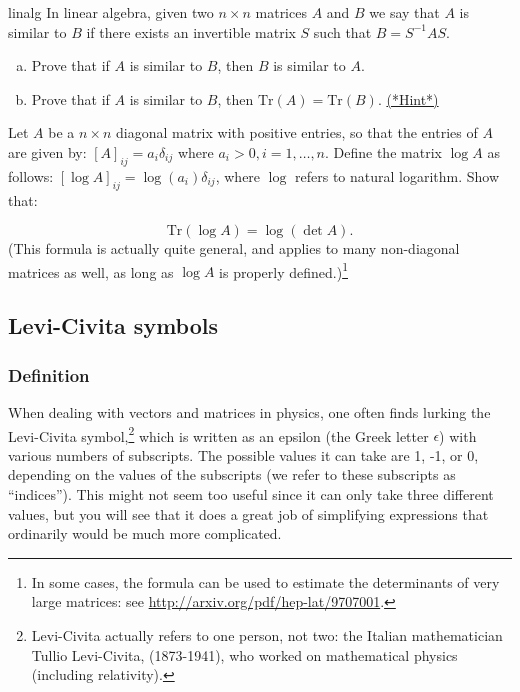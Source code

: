 \begin {exercise}{linalg}
In linear algebra, given two $n \times n$ matrices $A$ and $B$ we say that $A$ is {\bfi similar} to $B$ if there exists an invertible matrix $S$ such that $B = S^{-1}AS$. 
\begin{enumerate}[(a)]
\item
Prove that if $A$ is similar to $B$, then $B$ is similar to $A$.
\item
Prove that if $A$ is similar to $B$, then $\text{Tr} ({A}) = \text{Tr} ({B})$. 
\hyperref[sec:sigma:hints]{(*Hint*)} 
\end{enumerate}
\end{exercise}

\begin {exercise}{}
Let $A$ be a $n \times n$ diagonal matrix with positive entries, so that the entries of $A$ are given by:  $ [A]_{ij} = a_{i} \delta_{ij}$ where $a_i > 0, i = 1, \ldots, n$.  Define the matrix $\log A$ as follows:  $ [\log A]_{ij} = \log(a_{i}) \delta_{ij}$, where $\log$ refers to natural logarithm.  Show that:

\[ \text{Tr}(\log A) = \log (\det A). \]
(This formula is actually quite general, and applies to many non-diagonal matrices as well, as long as $\log A$ is properly defined.)\footnote{In some cases, the formula can be used to estimate the determinants of very large matrices: see \url{http://arxiv.org/pdf/hep-lat/9707001}.} 


\end{exercise}



\subsection{Levi-Civita symbols}
\subsubsection*{Definition}
When dealing with vectors and matrices in physics, one often finds lurking  the Levi-Civita symbol,\footnote{Levi-Civita actually refers to one person, not two: the Italian mathematician Tullio Levi-Civita, (1873-1941), who worked on mathematical physics (including relativity).} which is written as an epsilon (the Greek letter $\epsilon$) with various numbers of subscripts.  The possible values it can take are 1, -1, or 0, depending on the values of the subscripts (we refer to these subscripts as ``indices'').  This might not seem too useful since it can only take three different values, but you will see that it does a great job of simplifying expressions that ordinarily would be much more complicated.  

